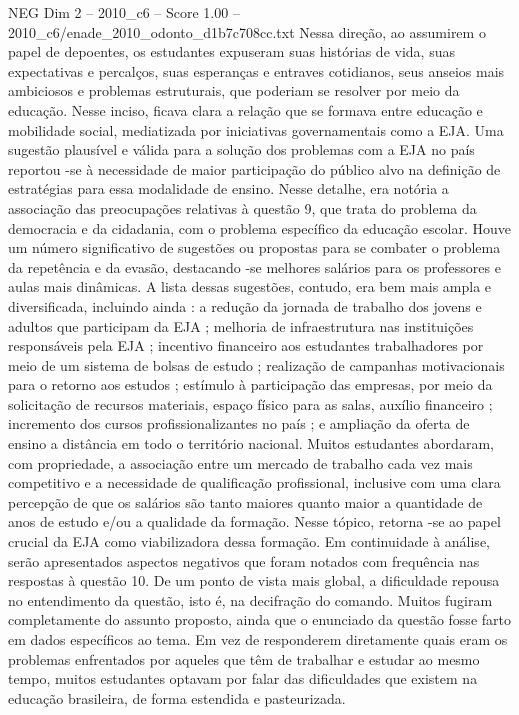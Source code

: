\begin{textsample}{NEG Dim 2 – 2010\_c6 – Score 1.00 – 2010\_c6/enade\_2010\_odonto\_d1b7c708cc.txt}
Nessa direção, ao assumirem o papel de depoentes, os estudantes expuseram suas histórias de vida, suas expectativas e percalços, suas esperanças e entraves cotidianos, seus anseios mais ambiciosos e problemas estruturais, que poderiam se resolver por meio da educação.
Nesse inciso, ficava clara a relação que se formava entre educação e mobilidade social, mediatizada por iniciativas governamentais como a EJA.
Uma sugestão plausível e válida para a solução dos problemas com a EJA no país reportou -se à necessidade de maior participação do público alvo na definição de estratégias para essa modalidade de ensino.
Nesse detalhe, era notória a associação das preocupações relativas à questão 9, que trata do problema da democracia e da cidadania, com o problema específico da educação escolar.
Houve um número significativo de sugestões ou propostas para se combater o problema da repetência e da evasão, destacando -se melhores salários para os professores e aulas mais dinâmicas.
A lista dessas sugestões, contudo, era bem mais ampla e diversificada, incluindo ainda : a redução da jornada de trabalho dos jovens e adultos que participam da EJA ; melhoria de infraestrutura nas instituições responsáveis pela EJA ; incentivo financeiro aos estudantes trabalhadores por meio de um sistema de bolsas de estudo ; realização de campanhas motivacionais para o retorno aos estudos ; estímulo à participação das empresas, por meio da solicitação de recursos materiais, espaço físico para as salas, auxílio financeiro ; incremento dos cursos profissionalizantes no país ; e ampliação da oferta de ensino a distância em todo o território nacional.
Muitos estudantes abordaram, com propriedade, a associação entre um mercado de trabalho cada vez mais competitivo e a necessidade de qualificação profissional, inclusive com uma clara percepção de que os salários são tanto maiores quanto maior a quantidade de anos de estudo e/ou a qualidade da formação.
Nesse tópico, retorna -se ao papel crucial da EJA como viabilizadora dessa formação.
Em continuidade à análise, serão apresentados aspectos negativos que foram notados com frequência nas respostas à questão 10.
De um ponto de vista mais global, a dificuldade repousa no entendimento da questão, isto é, na decifração do comando.
Muitos fugiram completamente do assunto proposto, ainda que o enunciado da questão fosse farto em dados específicos ao tema.
Em vez de responderem diretamente quais eram os problemas enfrentados por aqueles que têm de trabalhar e estudar ao mesmo tempo, muitos estudantes optavam por falar das dificuldades que existem na educação brasileira, de forma estendida e pasteurizada.

\end{textsample}

